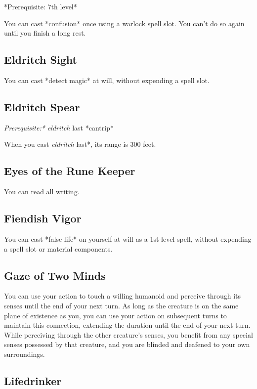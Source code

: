 *Prerequisite: 7th level*

You can cast *confusion* once using a warlock spell slot. You can’t do so again until you finish a long rest.

\subsection{Eldritch Sight}

You can cast *detect magic* at will, without expending a spell slot.

\subsection{Eldritch Spear}

\textit{Prerequisite:* eldritch }last *cantrip*

When you cast \textit{eldritch }last*, its range is 300 feet.

\subsection{Eyes of the Rune Keeper}

You can read all writing.

\subsection{Fiendish Vigor}

You can cast *false life* on yourself at will as a 1st-level spell, without expending a spell slot or material components.

\subsection{Gaze of Two Minds}

You can use your action to touch a willing humanoid and perceive through its senses until the end of your next turn. As long as the creature is on the same plane of existence as you, you can use your action on subsequent turns to maintain this connection, extending the duration until the end of your next turn. While perceiving through the other creature’s senses, you benefit from any special senses possessed by that creature, and you are blinded and deafened to your own surroundings.

\subsection{Lifedrinker}

